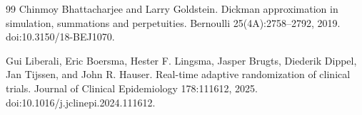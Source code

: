 \documentclass{article}
\begin{document}
\begin{thebibliography}{99}
   Chinmoy Bhattacharjee and Larry Goldstein. Dickman approximation in simulation, summations and perpetuities. Bernoulli 25(4A):2758--2792, 2019. doi:10.3150/18-BEJ1070.

   Gui Liberali, Eric Boersma, Hester F. Lingsma, Jasper Brugts, Diederik Dippel, Jan Tijssen, and John R. Hauser. Real-time adaptive randomization of clinical trials. Journal of Clinical Epidemiology 178:111612, 2025. doi:10.1016/j.jclinepi.2024.111612.

\end{thebibliography}
\end{document}
